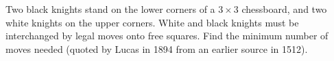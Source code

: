 Two black knights stand on the lower corners of a $3 \times 3$ chessboard, and two white knights on the upper corners. White and black knights must be interchanged by legal moves onto free squares. Find the minimum number of moves needed (quoted by Lucas in 1894 from an earlier source in 1512).
